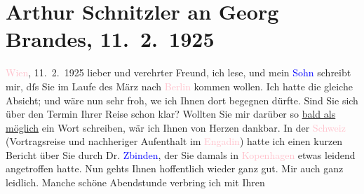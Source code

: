 

               \section[Arthur Schnitzler an Georg Brandes, 11. 2. 1925]{ Arthur Schnitzler an Georg Brandes, 11. 2. 1925}\nopagebreak{}\rehead{ }\normalsize\beginnumbering{} \toendnotes[C]{\smallbreak\pagebreak[2]} 
\toendnotes[C]{\smallbreak}\pstart
           \raggedleft{}{\pb}\textcolor{pink}{Wien}{}\ledrightnote{\textcolor{pink}{Wien}}, 11. 2. 1925\pend
           \pstart{}lieber und verehrter Freund,\pend\pstart
           ich lese, und mein \textcolor{blue}{Sohn}{}
                    schreibt mir, dſs Sie im Laufe des März nach \textcolor{pink}{Berlin}{}\ledrightnote{\textcolor{pink}{Berlin}} kommen wollen. Ich hatte die gleiche Absicht; und
                    wäre nun sehr froh, we{\geminationn} ich Ihnen dort begegnen
                    dürfte. Sind Sie sich über den Termin Ihrer Reise schon klar? Wollten Sie mir
                    darüber so \uline{bald als möglich} ein Wort schreiben,
                    wär ich Ihnen von Herzen dankbar.\pend
           \pstart
           In der \textcolor{pink}{Schweiz}{}\ledrightnote{\textcolor{pink}{Schweiz}} (Vortragsreise und nachheriger
                    Aufenthalt im \textcolor{pink}{Engadin}{}\ledrightnote{\textcolor{pink}{Engadin}}) {\pb}hatte ich einen kurzen Bericht über Sie
                    durch Dr. \textcolor{blue}{Zbinden}{}\ledrightnote{\textcolor{blue}{Hans Zbinden}}, der Sie damals in \textcolor{pink}{Kopenhagen}{}\ledrightnote{\textcolor{pink}{Kopenhagen}} etwas leidend angetroffen hatte.
                    Nun gehts Ihnen hoffentlich wieder ganz gut. Mir auch ganz leidlich. Manche  schöne Abendstunde verbring ich mit Ihren
